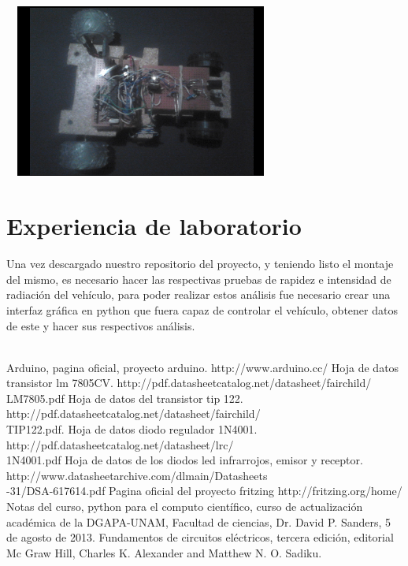 \documentclass[12]{article}
\newenvironment{Figure}
{\par\medskip\noindent\minipage{\linewidth}}
{\endminipage\par\medskip}
\begin{document}
\begin{multicols}{2}
\begin{Figure}	
\center
\includegraphics[width=9cm, height=5.7cm]{img/cap6.png} 
\label{fig:g9}
\end{Figure}
\vspace{0.6 cm}

\section{Experiencia de laboratorio}

Una vez descargado nuestro repositorio del proyecto, y teniendo listo el montaje del mismo, es necesario hacer las respectivas pruebas de rapidez e intensidad de radiación del vehículo, para poder realizar estos análisis fue necesario crear una interfaz gráfica en python\cite{PYTHON} que fuera capaz de controlar el  vehículo, obtener datos de este y hacer sus respectivos análisis.\\\\

\begin{thebibliography}{99}
 Arduino, pagina oficial, proyecto arduino. http://www.arduino.cc/
 Hoja de datos  transistor lm 7805CV. http://pdf.datasheetcatalog.net/datasheet/fairchild/\\LM7805.pdf
 Hoja de datos del transistor tip 122. http://pdf.datasheetcatalog.net/datasheet/fairchild/\\TIP122.pdf.
  Hoja de datos diodo regulador 1N4001. http://pdf.datasheetcatalog.net/datasheet/lrc/\\1N4001.pdf
 Hoja de datos de los diodos led infrarrojos, emisor y receptor. \\ http://www.datasheetarchive.com/dlmain/Datasheets\\-31/DSA-617614.pdf
 Pagina oficial del proyecto fritzing http://fritzing.org/home/ 
 Notas del curso, python para el computo científico, curso de actualización académica de la DGAPA-UNAM, Facultad de ciencias, Dr. David P. Sanders, 5 de agosto de 2013. 
 Fundamentos de circuitos eléctricos, tercera edición, editorial Mc Graw Hill, Charles K. Alexander and Matthew N. O. Sadiku. 
\end{thebibliography}
\end{multicols}
\end{document}
